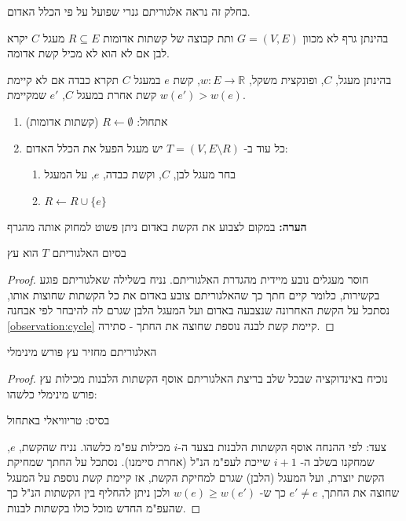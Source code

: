 בחלק זה נראה אלגוריתם גנרי שפועל על פי הכלל האדום.

\begin{definition}
בהינתן גרף לא מכוון
$G = (V,E)$
ותת קבוצה של קשתות אדומות
$R \subseteq E$
מעגל $C$ יקרא לבן אם לא הוא לא מכיל קשת אדומה.
\end{definition}
\begin{definition}
בהינתן מעגל, $C$, ופונקצית משקל, 
$w: E \to \mathbb{R}$,
קשת $e$ במעגל $C$ תקרא כבדה אם לא קיימת קשת אחרת במעגל $C$, 
$e'$
שמקיימת 
$w(e') > w(e)$.
\end{definition}
\begin{enumerate}
\item
אתחול:
$R \leftarrow \emptyset$ 
(קשתות אדומות)
\item
כל עוד ב-%
$T = (V, E \setminus R)$
יש מעגל הפעל את הכלל האדום:
\begin{enumerate}
\item
בחר מעגל לבן, $C$, וקשת כבדה, $e$, על המעגל
\item
$R \leftarrow R \cup \{e\}$
\end{enumerate}
\end{enumerate}

\textbf{הערה:}
במקום לצבוע את הקשת באדום ניתן פשוט למחוק אותה מהגרף
\begin{claim}
בסיום האלגוריתם $T$ הוא עץ
\end{claim}
\begin{proof}
חוסר מעגלים נובע מיידית מהגדרת האלגוריתם.
נניח בשלילה שאלגוריתם פוגע בקשירות, כלומר קיים חתך כך שהאלגוריתם צובע באדום את כל הקשתות 
שחוצות אותו, נסתכל על הקשת האחרונה שנצבעה באדום ועל המעגל הלבן שגרם לה להיבחר לפי אבחנה 
\ref{observation:cycle}
קיימת קשת לבנה נוספת שחוצה את החתך - סתירה.
\end{proof}

\begin{claim}
\label{claim:red}
האלגוריתם מחזיר עץ פורש מינימלי
\end{claim}

\begin{proof}
נוכיח באינדוקציה שבכל שלב בריצת האלגוריתם אוסף הקשתות הלבנות מכילות עץ פורש מינימלי כלשהו:

בסיס: טריוויאלי באתחול

צעד: לפי ההנחה אוסף הקשתות הלבנות בצעד ה-$i$ מכילות עפ"מ כלשהו.
נניח שהקשת, $e$, שמחקנו בשלב ה-%
$i+1$
שייכת לעפ"מ הנ"ל (אחרת סיימנו).
נסתכל על החתך שמחיקת הקשת יוצרת, ועל המעגל (הלבן) שגרם למחיקת הקשת,
אז קיימת קשת נוספת על המעגל שחוצה את החתך, 
$e' \neq e$
כך ש-%
$w(e) \geq w(e')$
ולכן ניתן להחליף בין הקשתות הנ"ל כך שהעפ"מ החדש מוכל כולו בקשתות לבנות.
\end{proof}


